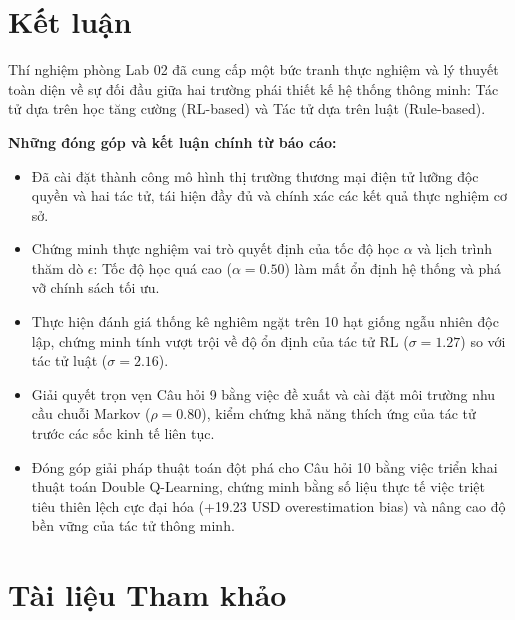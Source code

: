 \documentclass[12pt,a4paper]{article}
\begin{document}
\section{Kết luận}

Thí nghiệm phòng Lab 02 đã cung cấp một bức tranh thực nghiệm và lý thuyết toàn diện về sự đối đầu giữa hai trường phái thiết kế hệ thống thông minh: Tác tử dựa trên học tăng cường (RL-based) và Tác tử dựa trên luật (Rule-based). 

\textbf{Những đóng góp và kết luận chính từ báo cáo:}
\begin{itemize}
    \item Đã cài đặt thành công mô hình thị trường thương mại điện tử lưỡng độc quyền và hai tác tử, tái hiện đầy đủ và chính xác các kết quả thực nghiệm cơ sở.
    \item Chứng minh thực nghiệm vai trò quyết định của tốc độ học $\alpha$ và lịch trình thăm dò $\epsilon$: Tốc độ học quá cao ($\alpha=0.50$) làm mất ổn định hệ thống và phá vỡ chính sách tối ưu.
    \item Thực hiện đánh giá thống kê nghiêm ngặt trên 10 hạt giống ngẫu nhiên độc lập, chứng minh tính vượt trội về độ ổn định của tác tử RL ($\sigma = 1.27$) so với tác tử luật ($\sigma = 2.16$).
    \item Giải quyết trọn vẹn Câu hỏi 9 bằng việc đề xuất và cài đặt môi trường nhu cầu chuỗi Markov ($\rho=0.80$), kiểm chứng khả năng thích ứng của tác tử trước các sốc kinh tế liên tục.
    \item Đóng góp giải pháp thuật toán đột phá cho Câu hỏi 10 bằng việc triển khai thuật toán Double Q-Learning, chứng minh bằng số liệu thực tế việc triệt tiêu thiên lệch cực đại hóa (+19.23 USD overestimation bias) và nâng cao độ bền vững của tác tử thông minh.
\end{itemize}

\clearpage
\section*{Tài liệu Tham khảo}
\end{document}
